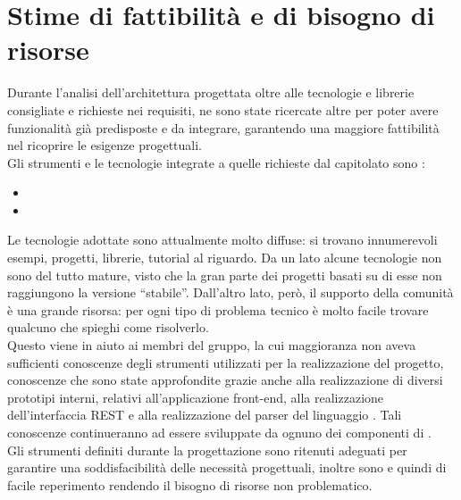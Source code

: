\section{Stime di fattibilità e di bisogno di risorse}

Durante l'analisi dell'architettura progettata oltre alle tecnologie e librerie consigliate e richieste nei requisiti, ne sono state ricercate altre per poter avere funzionalità già predisposte e da integrare, garantendo una maggiore fattibilità nel ricoprire le esigenze progettuali. \\
Gli strumenti e le tecnologie integrate a quelle richieste dal capitolato sono : 
\begin{itemize}
\item 
\item 
\end{itemize}

Le tecnologie adottate sono attualmente molto diffuse: si trovano innumerevoli esempi, progetti, librerie, tutorial al riguardo. Da un lato alcune tecnologie non sono del tutto mature, visto che la gran parte dei progetti basati su di esse non raggiungono la versione ``stabile''. Dall'altro lato, però, il supporto della comunità è una grande risorsa: per ogni tipo di problema tecnico è molto facile trovare qualcuno che spieghi come risolverlo. \\
Questo viene in aiuto ai membri del gruppo, la cui maggioranza non aveva sufficienti conoscenze degli strumenti utilizzati per la realizzazione del progetto, conoscenze che sono state approfondite grazie anche alla realizzazione di diversi prototipi interni, relativi all'applicazione front-end, alla realizzazione dell'interfaccia REST e alla realizzazione del parser del linguaggio .
Tali conoscenze continueranno ad essere sviluppate da ognuno dei componenti di \GroupName{}. \\

Gli strumenti definiti durante la progettazione sono ritenuti adeguati per garantire una soddisfacibilità delle necessità progettuali, inoltre sono  e quindi di facile reperimento rendendo il bisogno di risorse non problematico.



